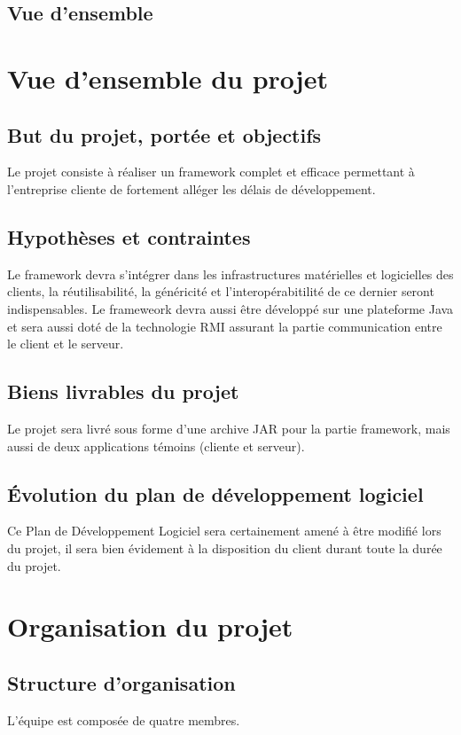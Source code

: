 \documentclass[a4paper,10pt,twoside]{article}
\begin{document}
\subsection{Vue d’ensemble}

\section{Vue d’ensemble du projet}
\subsection{But du projet, portée et objectifs}
Le projet consiste à réaliser un framework complet et efficace permettant à l'entreprise cliente de fortement alléger les délais de développement.

\subsection{Hypothèses et contraintes}
Le framework devra s'intégrer dans les infrastructures matérielles et logicielles des clients, la réutilisabilité, la généricité et l'interopérabitilité de ce dernier seront indispensables.
Le frameweork devra aussi être développé sur une plateforme Java et sera aussi doté de la technologie RMI assurant la partie communication entre le client et le serveur.

\subsection{Biens livrables du projet}
Le projet sera livré sous forme d'une archive JAR pour la partie framework,
mais aussi de deux applications témoins (cliente et serveur).

\subsection{Évolution du plan de développement logiciel}
Ce Plan de Développement Logiciel sera certainement amené à être modifié lors du projet, il sera bien évidement à la disposition du client durant toute la durée du projet.

\section{Organisation du projet}
\subsection{Structure d’organisation}
L'équipe est composée de quatre membres.
\end{document}
